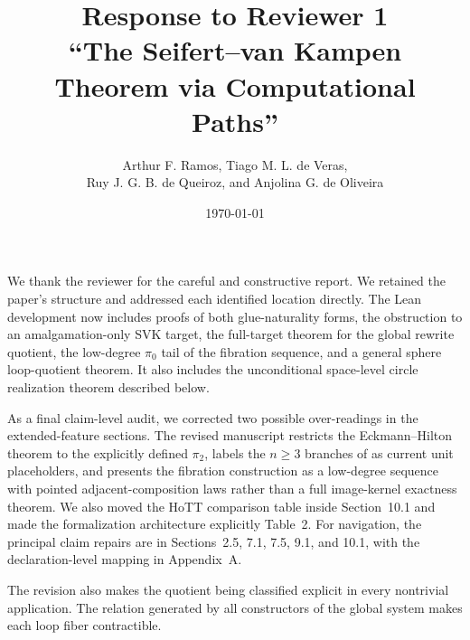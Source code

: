 \documentclass[11pt]{article}
\title{Response to Reviewer 1\\
\large ``The Seifert--van Kampen Theorem via Computational Paths''}
\author{Arthur F. Ramos, Tiago M. L. de Veras,\\
Ruy J. G. B. de Queiroz, and Anjolina G. de Oliveira}
\date{\today}
\begin{document}
\maketitle

We thank the reviewer for the careful and constructive report.  We retained the
paper's structure and addressed each identified location directly.  The Lean
development now includes proofs of both glue-naturality forms, the obstruction
to an amalgamation-only SVK target, the full-target theorem for the global
rewrite quotient, the low-degree \(\pi_0\) tail of the fibration sequence, and
a general sphere loop-quotient theorem.  It also includes the unconditional
space-level circle realization theorem described below.

As a final claim-level audit, we corrected two possible over-readings in the
extended-feature sections.  The revised manuscript restricts the
Eckmann--Hilton theorem to the explicitly defined \(\pi_2\), labels the
\(n\geq3\) branches of  as current unit placeholders,
and presents the fibration construction as a low-degree sequence with
pointed adjacent-composition laws rather than a full image-kernel exactness
theorem.  We also moved the HoTT comparison table inside Section~10.1 and
made the formalization architecture explicitly Table~2.  For navigation, the
principal claim repairs are in Sections~2.5, 7.1, 7.5, 9.1, and 10.1, with the
declaration-level mapping in Appendix~A.

The revision also makes the quotient being classified explicit in every
nontrivial application.  The relation generated by all constructors of the
global  system makes each  loop fiber
contractible.
\end{document}
